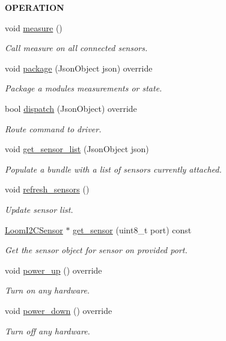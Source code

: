 \begin{Indent}{\bf O\+P\+E\+R\+A\+T\+I\+ON}\par
\begin{DoxyCompactItemize}
\item 
void \hyperlink{class_loom___multiplexer_aefd28e7b8fa3faf53ec42cb25419057a}{measure} ()
\begin{DoxyCompactList}\small\item\em Call measure on all connected sensors. \end{DoxyCompactList}\item 
void \hyperlink{class_loom___multiplexer_aa09d42f26ce3c4185ae8e9b55e3d851f}{package} (Json\+Object json) override
\begin{DoxyCompactList}\small\item\em Package a modules measurements or state. \end{DoxyCompactList}\item 
bool \hyperlink{class_loom___multiplexer_abadc1f55ae04c66e761d366325a0804f}{dispatch} (Json\+Object) override
\begin{DoxyCompactList}\small\item\em Route command to driver. \end{DoxyCompactList}\item 
void \hyperlink{class_loom___multiplexer_a80fd7464a74af9a325cbf830ee51410e}{get\+\_\+sensor\+\_\+list} (Json\+Object json)
\begin{DoxyCompactList}\small\item\em Populate a bundle with a list of sensors currently attached. \end{DoxyCompactList}\item 
void \hyperlink{class_loom___multiplexer_ac0749b8dc8f72727e7fab5834898d2da}{refresh\+\_\+sensors} ()
\begin{DoxyCompactList}\small\item\em Update sensor list. \end{DoxyCompactList}\item 
\hyperlink{class_loom_i2_c_sensor}{Loom\+I2\+C\+Sensor} $\ast$ \hyperlink{class_loom___multiplexer_aa0745a2b7a8e4f48fb4f74f759e87220}{get\+\_\+sensor} (uint8\+\_\+t port) const 
\begin{DoxyCompactList}\small\item\em Get the sensor object for sensor on provided port. \end{DoxyCompactList}\item 
void \hyperlink{class_loom___multiplexer_ad09225b1a4c8b70735992cd5eac9a71b}{power\+\_\+up} () override
\begin{DoxyCompactList}\small\item\em Turn on any hardware. \end{DoxyCompactList}\item 
void \hyperlink{class_loom___multiplexer_a8196a461d4b93f39f7b469ae89fa17c7}{power\+\_\+down} () override
\begin{DoxyCompactList}\small\item\em Turn off any hardware. \end{DoxyCompactList}\end{DoxyCompactItemize}
\end{Indent}
